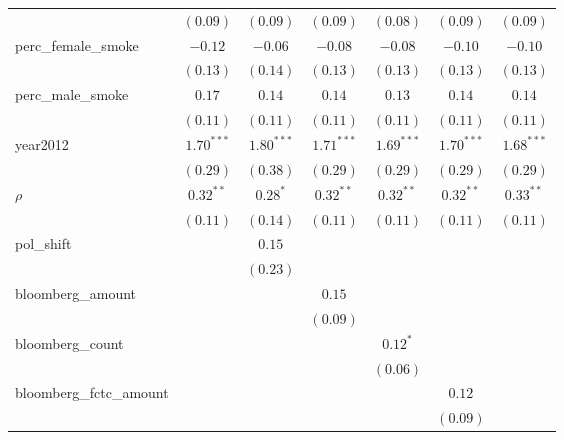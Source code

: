\begin{table}[!h]
\begin{center}
\begin{tabular}{l c c c c c c }
                        & $(0.09)$     & $(0.09)$     & $(0.09)$     & $(0.08)$     & $(0.09)$     & $(0.09)$     \\
perc\_female\_smoke     & $-0.12$      & $-0.06$      & $-0.08$      & $-0.08$      & $-0.10$      & $-0.10$      \\
                        & $(0.13)$     & $(0.14)$     & $(0.13)$     & $(0.13)$     & $(0.13)$     & $(0.13)$     \\
perc\_male\_smoke       & $0.17$       & $0.14$       & $0.14$       & $0.13$       & $0.14$       & $0.14$       \\
                        & $(0.11)$     & $(0.11)$     & $(0.11)$     & $(0.11)$     & $(0.11)$     & $(0.11)$     \\
year2012                & $1.70^{***}$ & $1.80^{***}$ & $1.71^{***}$ & $1.69^{***}$ & $1.70^{***}$ & $1.68^{***}$ \\
                        & $(0.29)$     & $(0.38)$     & $(0.29)$     & $(0.29)$     & $(0.29)$     & $(0.29)$     \\
$\rho$                  & $0.32^{**}$  & $0.28^{*}$   & $0.32^{**}$  & $0.32^{**}$  & $0.32^{**}$  & $0.33^{**}$  \\
                        & $(0.11)$     & $(0.14)$     & $(0.11)$     & $(0.11)$     & $(0.11)$     & $(0.11)$     \\
pol\_shift              &              & $0.15$       &              &              &              &              \\
                        &              & $(0.23)$     &              &              &              &              \\
bloomberg\_amount       &              &              & $0.15$       &              &              &              \\
                        &              &              & $(0.09)$     &              &              &              \\
bloomberg\_count        &              &              &              & $0.12^{*}$   &              &              \\
                        &              &              &              & $(0.06)$     &              &              \\
bloomberg\_fctc\_amount &              &              &              &              & $0.12$       &              \\
                        &              &              &              &              & $(0.09)$     &              \\

\end{tabular}
\end{center}
\end{table}
